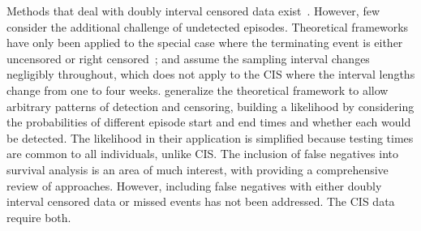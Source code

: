 \documentclass[referee,useAMS,usenatbib]{biom}
\newcommand\citePersonalComms[1]{(#1, personal communication)}
\begin{document}
Methods that deal with doubly interval censored data exist~\citep{sunStatistical,bogaertsSurvival}.
However, few consider the additional challenge of undetected episodes.
Theoretical frameworks~\citep{turnbullEmpirical,dempsterMaximum} have only been applied to the special case where the terminating event is either uncensored or right censored~\citep[e.g.][]{sunEmpirical,bacchettiNonparametric,shenNonparametric}; and
assume the sampling interval changes negligibly throughout, which does not apply to the CIS where the interval lengths change from one to four weeks. %
\citet{heiseyModelling} generalize the theoretical framework to allow arbitrary patterns of detection and censoring, building a likelihood by considering the probabilities of different episode start and end times and whether each would be detected.
The likelihood in their application is simplified because testing times are common to all individuals, unlike CIS.
The inclusion of false negatives into survival analysis is an area of much interest, with
\citet{piresIntervalMisclassify} providing a comprehensive review of approaches. However, including false negatives with either doubly interval censored data or missed events has not been addressed. The CIS data require both.
\end{document}
